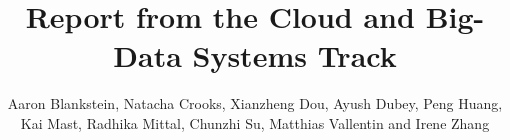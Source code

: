 \documentclass[11pt]{article}
\date{}
\title{
Report from the Cloud and Big-Data Systems Track
}
\author
{
Aaron Blankstein, Natacha Crooks, Xianzheng Dou, Ayush Dubey, Peng Huang, \\
Kai Mast, Radhika Mittal,  Chunzhi Su, Matthias Vallentin and Irene Zhang
}
\theoremstyle{definition}
\begin{document}
\maketitle



{


}
\end{document}
